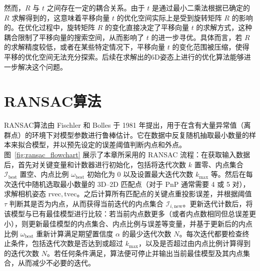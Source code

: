 然而，$R$ 与 $t$ 之间存在一定的耦合关系。由于 $t$ 是通过最小二乘法根据已确定的 $R$ 求解得到的，这意味着平移向量 $t$ 的优化空间实际上是受到旋转矩阵 $R$ 的影响的。在优化过程中，旋转矩阵 $R$ 的变化直接决定了平移向量 $t$ 的求解方式，这种耦合限制了平移向量的搜索空间，从而影响了 $t$ 的进一步寻优。具体而言，若 $R$ 的求解精度较低，或者在某些特定情况下，平移向量 $t$ 的变化范围被压缩，使得平移的优化空间无法充分探索。后续在求解出的6D姿态上进行的优化算法能够进一步解决这个问题。



\section{RANSAC算法}
\label{sec:ransac_pnp}

RANSAC算法由 Fischler 和 Bolles 于 1981 年提出，用于在含有大量异常值（离群点）的环境下对模型参数进行鲁棒估计。它在数据中反复随机抽取最小数量的样本来拟合模型，并以预先设定的误差阈值判断内点和外点。图~\ref{fig:ransac_flowchart} 展示了本章所采用的 RANSAC 流程：在获取输入数据后，首先对关键变量和计数器进行初始化，包括将迭代次数 \(k\) 置零、内点集合 \(\mathcal{I}_{\text{best}}\) 置空、内点比例 \(\omega_{\text{best}}\) 初始化为 0 以及设置最大迭代次数 \(k_{\max}\) 等。然后在每次迭代中随机选取最小数量的 3D--2D 匹配点（对于 PnP 通常需要 4 或 5 对），求解相机姿态 \(\mathrm{rvec}, \mathrm{tvec}\)。之后计算所有匹配点的关键点重投影误差，并根据阈值 \(\tau\) 判断其是否为内点，从而获得当前迭代的内点集合 \(\mathcal{I}_{i,\text{new}}\)。更新迭代计数后，将该模型与已有最佳模型进行比较：若当前内点数更多（或者内点数相同但总误差更小），则更新最佳模型的内点集合、内点比例与误差等变量，并基于更新后的内点比例 \(\omega_{\text{best}}\) 重新计算满足期望置信度 \(\alpha\) 的最少迭代次数 \(N\)。每次迭代都要检查终止条件，包括迭代次数是否达到或超过 \(k_{\max}\)，以及是否超过由内点比例计算得到的迭代次数 \(N\)。若任何条件满足，算法便可停止并输出当前最佳模型及其内点集合，从而减少不必要的迭代。


